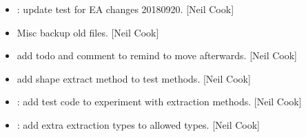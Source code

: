 \documentclass[a4paper,10pt,english]{report}
\begin{document}
\begin{itemize}
\item {} 
: update test for EA changes 2018\sphinxhyphen{}09\sphinxhyphen{}20. {[}Neil
Cook{]}

\item {} 
Misc \sphinxhyphen{} backup old files. {[}Neil Cook{]}

\item {} 
 \sphinxhyphen{} add todo and comment to remind to move afterwards.
{[}Neil Cook{]}

\item {} 
 \sphinxhyphen{} add shape extract method to test methods. {[}Neil Cook{]}

\item {} 
: add test code to experiment with extraction
methods. {[}Neil Cook{]}

\item {} 
: add extra extraction types to allowed types.
{[}Neil Cook{]}

\end{itemize}
\end{document}
